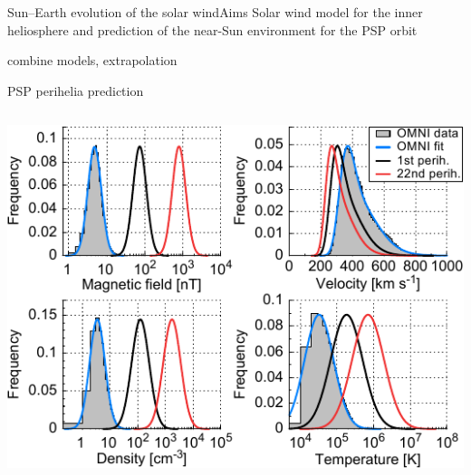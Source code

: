 \begin{frame}[c]{Sun--Earth evolution of the solar wind}{Aims}
	Solar wind model for the inner heliosphere and prediction of the near-Sun environment for the PSP orbit
\end{frame}

\begin{frame}[c]{}{}
	combine models, extrapolation
\end{frame}
\begin{frame}[c]{PSP perihelia prediction}{}
	\begin{columns}[c]
		
		\includegraphics[width=\textwidth]{../figures_paper/SPP_sw_distributions_b.pdf}


	\end{columns}
\end{frame}



% 





